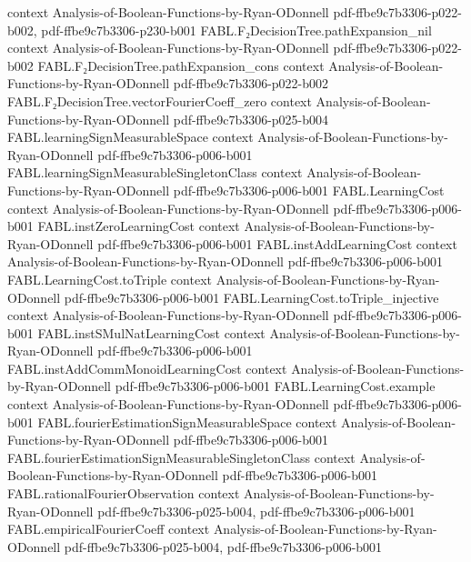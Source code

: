 \begin{theorem}
  {context}
  {Analysis-of-Boolean-Functions-by-Ryan-ODonnell}
  {pdf-ffbe9c7b3306-p022-b002,
    pdf-ffbe9c7b3306-p230-b001}
\proofstep
  {FABL.F₂DecisionTree.pathExpansion_nil}
  {context}
  {Analysis-of-Boolean-Functions-by-Ryan-ODonnell}
  {pdf-ffbe9c7b3306-p022-b002}
\proofstep
  {FABL.F₂DecisionTree.pathExpansion_cons}
  {context}
  {Analysis-of-Boolean-Functions-by-Ryan-ODonnell}
  {pdf-ffbe9c7b3306-p022-b002}
\proofstep
  {FABL.F₂DecisionTree.vectorFourierCoeff_zero}
  {context}
  {Analysis-of-Boolean-Functions-by-Ryan-ODonnell}
  {pdf-ffbe9c7b3306-p025-b004}
\proofstep
  {FABL.learningSignMeasurableSpace}
  {context}
  {Analysis-of-Boolean-Functions-by-Ryan-ODonnell}
  {pdf-ffbe9c7b3306-p006-b001}
\proofstep
  {FABL.learningSignMeasurableSingletonClass}
  {context}
  {Analysis-of-Boolean-Functions-by-Ryan-ODonnell}
  {pdf-ffbe9c7b3306-p006-b001}
\proofstep
  {FABL.LearningCost}
  {context}
  {Analysis-of-Boolean-Functions-by-Ryan-ODonnell}
  {pdf-ffbe9c7b3306-p006-b001}
\proofstep
  {FABL.instZeroLearningCost}
  {context}
  {Analysis-of-Boolean-Functions-by-Ryan-ODonnell}
  {pdf-ffbe9c7b3306-p006-b001}
\proofstep
  {FABL.instAddLearningCost}
  {context}
  {Analysis-of-Boolean-Functions-by-Ryan-ODonnell}
  {pdf-ffbe9c7b3306-p006-b001}
\proofstep
  {FABL.LearningCost.toTriple}
  {context}
  {Analysis-of-Boolean-Functions-by-Ryan-ODonnell}
  {pdf-ffbe9c7b3306-p006-b001}
\proofstep
  {FABL.LearningCost.toTriple_injective}
  {context}
  {Analysis-of-Boolean-Functions-by-Ryan-ODonnell}
  {pdf-ffbe9c7b3306-p006-b001}
\proofstep
  {FABL.instSMulNatLearningCost}
  {context}
  {Analysis-of-Boolean-Functions-by-Ryan-ODonnell}
  {pdf-ffbe9c7b3306-p006-b001}
\proofstep
  {FABL.instAddCommMonoidLearningCost}
  {context}
  {Analysis-of-Boolean-Functions-by-Ryan-ODonnell}
  {pdf-ffbe9c7b3306-p006-b001}
\proofstep
  {FABL.LearningCost.example}
  {context}
  {Analysis-of-Boolean-Functions-by-Ryan-ODonnell}
  {pdf-ffbe9c7b3306-p006-b001}
\proofstep
  {FABL.fourierEstimationSignMeasurableSpace}
  {context}
  {Analysis-of-Boolean-Functions-by-Ryan-ODonnell}
  {pdf-ffbe9c7b3306-p006-b001}
\proofstep
  {FABL.fourierEstimationSignMeasurableSingletonClass}
  {context}
  {Analysis-of-Boolean-Functions-by-Ryan-ODonnell}
  {pdf-ffbe9c7b3306-p006-b001}
\proofstep
  {FABL.rationalFourierObservation}
  {context}
  {Analysis-of-Boolean-Functions-by-Ryan-ODonnell}
  {pdf-ffbe9c7b3306-p025-b004,
    pdf-ffbe9c7b3306-p006-b001}
\proofstep
  {FABL.empiricalFourierCoeff}
  {context}
  {Analysis-of-Boolean-Functions-by-Ryan-ODonnell}
  {pdf-ffbe9c7b3306-p025-b004,
    pdf-ffbe9c7b3306-p006-b001}

\end{theorem}
